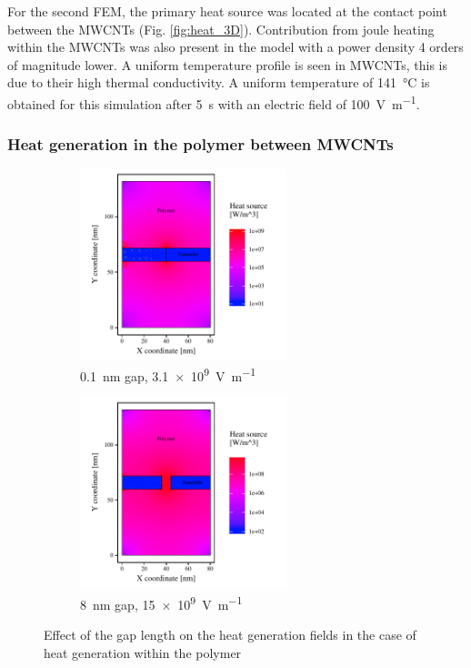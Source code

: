 \documentclass[11pt,review,times]{elsarticle}
\begin{document}
For the second FEM, the primary heat source was located at the contact point between the MWCNTs (Fig. \ref{fig:heat_3D}).
Contribution from joule heating within the MWCNTs was also present in the model with a power density 4 orders of magnitude lower.  
A uniform temperature profile is seen in MWCNTs, this is due to their high thermal conductivity. 
A uniform temperature of \SI{141}{\celsius} is obtained for this simulation after \SI{5}{\second} with an electric field of \SI{100}{\volt\per\metre}. 

\subsubsection{Heat generation in the polymer between MWCNTs}
	\label{subsection:mechanism3}

\begin{figure}[htb]
	\centering
	\begin{subfigure}{60mm}
		\centering
		\captionsetup{width=55mm}
		\includegraphics[width=60mm]{resultats_0,1nm_comsol_2D_puissance}
		\caption{\SI{0.1}{\nano\metre} gap, \SI{3.1e9}{\volt\per\metre}}
		\label{fig:result_gap01nm_power}		
	\end{subfigure} 
	\begin{subfigure}{60mm}
		\centering
		\captionsetup{width=55mm}
		\includegraphics[width=60mm]{resultats_8nm_comsol_2D_puissance}
		\caption{\SI{8}{\nano\metre} gap, \SI{15e9}{\volt\per\metre}}
		\label{fig:result_gap8nm_power}		
	\end{subfigure}
	\caption{Effect of the gap length on the heat generation fields in the case of heat generation within the polymer}
	\label{fig:result_gap_power}
\end{figure}
\end{document}
